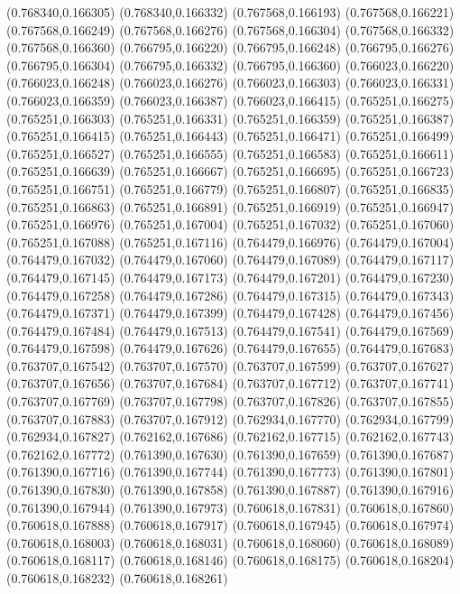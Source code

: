 (0.768340,0.166305)
(0.768340,0.166332)
(0.767568,0.166193)
(0.767568,0.166221)
(0.767568,0.166249)
(0.767568,0.166276)
(0.767568,0.166304)
(0.767568,0.166332)
(0.767568,0.166360)
(0.766795,0.166220)
(0.766795,0.166248)
(0.766795,0.166276)
(0.766795,0.166304)
(0.766795,0.166332)
(0.766795,0.166360)
(0.766023,0.166220)
(0.766023,0.166248)
(0.766023,0.166276)
(0.766023,0.166303)
(0.766023,0.166331)
(0.766023,0.166359)
(0.766023,0.166387)
(0.766023,0.166415)
(0.765251,0.166275)
(0.765251,0.166303)
(0.765251,0.166331)
(0.765251,0.166359)
(0.765251,0.166387)
(0.765251,0.166415)
(0.765251,0.166443)
(0.765251,0.166471)
(0.765251,0.166499)
(0.765251,0.166527)
(0.765251,0.166555)
(0.765251,0.166583)
(0.765251,0.166611)
(0.765251,0.166639)
(0.765251,0.166667)
(0.765251,0.166695)
(0.765251,0.166723)
(0.765251,0.166751)
(0.765251,0.166779)
(0.765251,0.166807)
(0.765251,0.166835)
(0.765251,0.166863)
(0.765251,0.166891)
(0.765251,0.166919)
(0.765251,0.166947)
(0.765251,0.166976)
(0.765251,0.167004)
(0.765251,0.167032)
(0.765251,0.167060)
(0.765251,0.167088)
(0.765251,0.167116)
(0.764479,0.166976)
(0.764479,0.167004)
(0.764479,0.167032)
(0.764479,0.167060)
(0.764479,0.167089)
(0.764479,0.167117)
(0.764479,0.167145)
(0.764479,0.167173)
(0.764479,0.167201)
(0.764479,0.167230)
(0.764479,0.167258)
(0.764479,0.167286)
(0.764479,0.167315)
(0.764479,0.167343)
(0.764479,0.167371)
(0.764479,0.167399)
(0.764479,0.167428)
(0.764479,0.167456)
(0.764479,0.167484)
(0.764479,0.167513)
(0.764479,0.167541)
(0.764479,0.167569)
(0.764479,0.167598)
(0.764479,0.167626)
(0.764479,0.167655)
(0.764479,0.167683)
(0.763707,0.167542)
(0.763707,0.167570)
(0.763707,0.167599)
(0.763707,0.167627)
(0.763707,0.167656)
(0.763707,0.167684)
(0.763707,0.167712)
(0.763707,0.167741)
(0.763707,0.167769)
(0.763707,0.167798)
(0.763707,0.167826)
(0.763707,0.167855)
(0.763707,0.167883)
(0.763707,0.167912)
(0.762934,0.167770)
(0.762934,0.167799)
(0.762934,0.167827)
(0.762162,0.167686)
(0.762162,0.167715)
(0.762162,0.167743)
(0.762162,0.167772)
(0.761390,0.167630)
(0.761390,0.167659)
(0.761390,0.167687)
(0.761390,0.167716)
(0.761390,0.167744)
(0.761390,0.167773)
(0.761390,0.167801)
(0.761390,0.167830)
(0.761390,0.167858)
(0.761390,0.167887)
(0.761390,0.167916)
(0.761390,0.167944)
(0.761390,0.167973)
(0.760618,0.167831)
(0.760618,0.167860)
(0.760618,0.167888)
(0.760618,0.167917)
(0.760618,0.167945)
(0.760618,0.167974)
(0.760618,0.168003)
(0.760618,0.168031)
(0.760618,0.168060)
(0.760618,0.168089)
(0.760618,0.168117)
(0.760618,0.168146)
(0.760618,0.168175)
(0.760618,0.168204)
(0.760618,0.168232)
(0.760618,0.168261)
